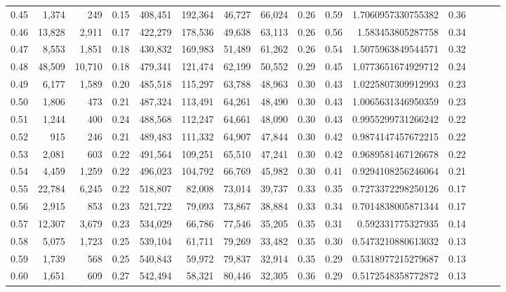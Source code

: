\begin{tabular}{rrrrrrrrrrrrrrr}
0.45 &   1,374 &     249 &  0.15 &  408,451 &  192,364 &   46,727 &   66,024 &  0.26 &  0.59 &    1.7060957330755382 &      0.36 \\
0.46 &  13,828 &   2,911 &  0.17 &  422,279 &  178,536 &   49,638 &   63,113 &  0.26 &  0.56 &     1.583453805287758 &      0.34 \\
0.47 &   8,553 &   1,851 &  0.18 &  430,832 &  169,983 &   51,489 &   61,262 &  0.26 &  0.54 &    1.5075963849544571 &      0.32 \\
0.48 &  48,509 &  10,710 &  0.18 &  479,341 &  121,474 &   62,199 &   50,552 &  0.29 &  0.45 &    1.0773651674929712 &      0.24 \\
0.49 &   6,177 &   1,589 &  0.20 &  485,518 &  115,297 &   63,788 &   48,963 &  0.30 &  0.43 &    1.0225807309912993 &      0.23 \\
0.50 &   1,806 &     473 &  0.21 &  487,324 &  113,491 &   64,261 &   48,490 &  0.30 &  0.43 &    1.0065631346950359 &      0.23 \\
0.51 &   1,244 &     400 &  0.24 &  488,568 &  112,247 &   64,661 &   48,090 &  0.30 &  0.43 &    0.9955299731266242 &      0.22 \\
0.52 &     915 &     246 &  0.21 &  489,483 &  111,332 &   64,907 &   47,844 &  0.30 &  0.42 &    0.9874147457672215 &      0.22 \\
0.53 &   2,081 &     603 &  0.22 &  491,564 &  109,251 &   65,510 &   47,241 &  0.30 &  0.42 &    0.9689581467126678 &      0.22 \\
0.54 &   4,459 &   1,259 &  0.22 &  496,023 &  104,792 &   66,769 &   45,982 &  0.30 &  0.41 &    0.9294108256246064 &      0.21 \\
0.55 &  22,784 &   6,245 &  0.22 &  518,807 &   82,008 &   73,014 &   39,737 &  0.33 &  0.35 &    0.7273372298250126 &      0.17 \\
0.56 &   2,915 &     853 &  0.23 &  521,722 &   79,093 &   73,867 &   38,884 &  0.33 &  0.34 &    0.7014838005871344 &      0.17 \\
0.57 &  12,307 &   3,679 &  0.23 &  534,029 &   66,786 &   77,546 &   35,205 &  0.35 &  0.31 &     0.592331775327935 &      0.14 \\
0.58 &   5,075 &   1,723 &  0.25 &  539,104 &   61,711 &   79,269 &   33,482 &  0.35 &  0.30 &    0.5473210880613032 &      0.13 \\
0.59 &   1,739 &     568 &  0.25 &  540,843 &   59,972 &   79,837 &   32,914 &  0.35 &  0.29 &    0.5318977215279687 &      0.13 \\
0.60 &   1,651 &     609 &  0.27 &  542,494 &   58,321 &   80,446 &   32,305 &  0.36 &  0.29 &    0.5172548358772872 &      0.13 \\

\end{tabular}
